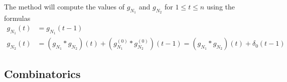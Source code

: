     The method will compute the values of $g_{N_1}$ and $g_{N_2}$ for $1 \leq t \leq n$ using the formulas
    \begin{align*}
    g_{N_1}(t) &= g_{N_1}(t-1) \\
    g_{N_2}(t) &= (g_{N_1} * g_{N_2})(t) + (g_{N_1}^{(0)} * g_{N_2}^{(0)})(t-1) = (g_{N_1} * g_{N_2})(t) + \delta_0(t-1)
    \end{align*}

    


  \subsection{Combinatorics}

    